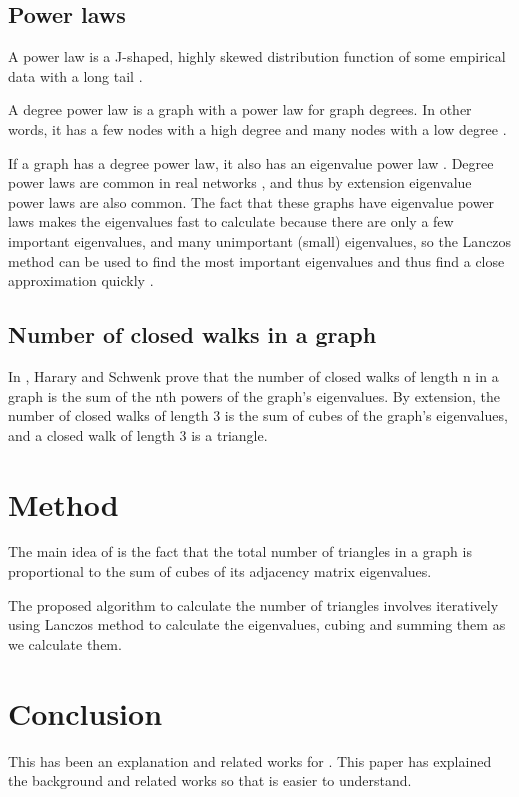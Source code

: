\documentclass{acm_proc_article-sp}
\begin{document}
\subsection{Power laws}
A power law is a J-shaped, highly skewed distribution function of some
empirical data with a long tail \cite{simon}.

A degree power law is a graph with a power law for graph degrees. In other
words, it has a few nodes with a high degree and many nodes with a low degree
\cite{mihail}.

If a graph has a degree power law, it also has an eigenvalue power law
\cite{mihail}. Degree power laws are common in real networks \cite{original},
and thus by extension eigenvalue power laws are also common. The fact that
these graphs have eigenvalue power laws makes the eigenvalues fast to calculate
because there are only a few important eigenvalues, and many unimportant
(small) eigenvalues, so the Lanczos method can be used to find the most
important eigenvalues and thus find a close approximation quickly \cite{original}.

\subsection{Number of closed walks in a graph}
In \cite{harary}, Harary and Schwenk prove that the number of closed walks of
length n in a graph is the sum of the nth powers of the graph's eigenvalues. By
extension, the number of closed walks of length 3 is the sum of cubes of the
graph's eigenvalues, and a closed walk of length 3 is a triangle.

\section{Method}
The main idea of \cite{original} is the fact that the total number of triangles
in a graph is proportional to the sum of cubes of its adjacency matrix
eigenvalues.

The proposed algorithm to calculate the number of triangles involves
iteratively using Lanczos method to calculate the eigenvalues, cubing and
summing them as we calculate them.

\section{Conclusion}
This has been an explanation and related works for \cite{original}. This paper
has explained the background and related works so that \cite{original} is
easier to understand.

%

%
%
\end{document}
